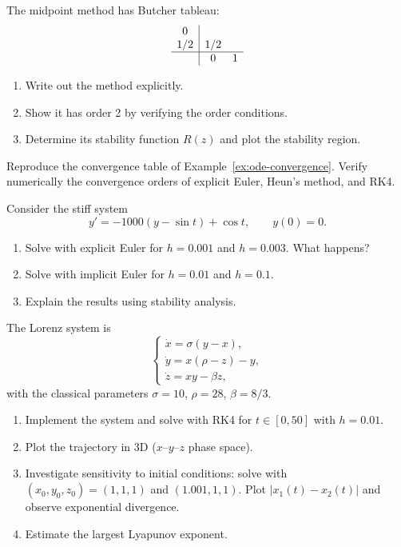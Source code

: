 \begin{exercise}[$\star\star$]
\label{ex:ch9-rk2-butcher}
The midpoint method has Butcher tableau:
\[
\begin{array}{c|cc}
    0   &     &   \\
    1/2 & 1/2 &   \\
    \hline
        & 0   & 1
\end{array}
\]
\begin{enumerate}
    \item Write out the method explicitly.
    \item Show it has order 2 by verifying the order conditions.
    \item Determine its stability function $R(z)$ and plot the stability region.
\end{enumerate}
\end{exercise}

\begin{exercise}[$\star\star$]
\label{ex:ch9-convergence-table}
Reproduce the convergence table of Example~\ref{ex:ode-convergence}. Verify numerically the convergence orders of explicit Euler, Heun's method, and RK4.
\end{exercise}

\begin{exercise}[$\star\star$]
\label{ex:ch9-stiff}
Consider the stiff system
\[
    y' = -1000(y - \sin t) + \cos t, \qquad y(0) = 0.
\]
\begin{enumerate}
    \item Solve with explicit Euler for $h = 0.001$ and $h = 0.003$. What happens?
    \item Solve with implicit Euler for $h = 0.01$ and $h = 0.1$.
    \item Explain the results using stability analysis.
\end{enumerate}
\end{exercise}

\begin{exercise}
\label{ex:ch9-lorenz}
The Lorenz system is
\[
    \begin{cases}
        \dot{x} = \sigma(y - x), \\
        \dot{y} = x(\rho - z) - y, \\
        \dot{z} = xy - \beta z,
    \end{cases}
\]
with the classical parameters $\sigma = 10$, $\rho = 28$, $\beta = 8/3$.
\begin{enumerate}
    \item Implement the system and solve with RK4 for $t \in [0, 50]$ with $h = 0.01$.
    \item Plot the trajectory in 3D ($x$--$y$--$z$ phase space).
    \item Investigate sensitivity to initial conditions: solve with $(x_0, y_0, z_0) = (1, 1, 1)$ and $(1.001, 1, 1)$. Plot $|x_1(t) - x_2(t)|$ and observe exponential divergence.
    \item Estimate the largest Lyapunov exponent.
\end{enumerate}
\end{exercise}

